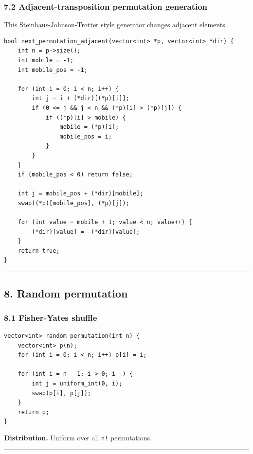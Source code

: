 \documentclass[11pt]{article}
\begin{document}
\subsubsection{7.2 Adjacent-transposition permutation generation}\label{adjacent-transposition-permutation-generation}

This Steinhaus-Johnson-Trotter style generator changes adjacent elements.

\begin{verbatim}
bool next_permutation_adjacent(vector<int> *p, vector<int> *dir) {
    int n = p->size();
    int mobile = -1;
    int mobile_pos = -1;

    for (int i = 0; i < n; i++) {
        int j = i + (*dir)[(*p)[i]];
        if (0 <= j && j < n && (*p)[i] > (*p)[j]) {
            if ((*p)[i] > mobile) {
                mobile = (*p)[i];
                mobile_pos = i;
            }
        }
    }
    if (mobile_pos < 0) return false;

    int j = mobile_pos + (*dir)[mobile];
    swap((*p)[mobile_pos], (*p)[j]);

    for (int value = mobile + 1; value < n; value++) {
        (*dir)[value] = -(*dir)[value];
    }
    return true;
}
\end{verbatim}

\begin{center}\rule{0.5\linewidth}{0.5pt}\end{center}

\subsection{8. Random permutation}\label{random-permutation}

\subsubsection{8.1 Fisher-Yates shuffle}\label{fisher-yates-shuffle}

\begin{verbatim}
vector<int> random_permutation(int n) {
    vector<int> p(n);
    for (int i = 0; i < n; i++) p[i] = i;

    for (int i = n - 1; i > 0; i--) {
        int j = uniform_int(0, i);
        swap(p[i], p[j]);
    }
    return p;
}
\end{verbatim}

\textbf{Distribution.} Uniform over all \texttt{n!} permutations.

\begin{center}\rule{0.5\linewidth}{0.5pt}\end{center}
\end{document}
